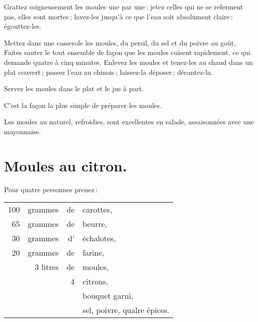 Grattez soigneusement les moules une par une ; jetez celles qui ne se referment
pas, elles sont mortes ; lavez-les jusqu'à ce que l'eau soit absolument
claire ; égouttez-les.

Mettez dans une casserole les moules, du persil, du sel et du poivre au goût,
Faites sauter le tout ensemble de façon que les moules cuisent rapidement, ce
qui demande quatre à cinq minutes. Enlevez les moules et tenez-les au chaud
dans un plat couvert ; passez l'eau au chinois ; laissez-la déposer ;
décantez-la.

Servez les moules dans le plat et le jus à part.

C'est la façon la plus simple de préparer les moules.

\sk

Les moules au naturel, refroidies, sont excellentes en salade, assaisonnées
avec une mayonnaise.

\section*{\centering Moules au citron.}

Pour quatre personnes prenez :

\medskip

\footnotesize
\begin{longtable}{rrrp{16em}}
    100 & grammes & de & carottes,                                                                        \\
     65 & grammes & de & beurre,                                                                          \\
     30 & grammes & d’ & échalotes,                                                                       \\
     20 & grammes & de & farine,                                                                          \\
        & 3 litres& de & moules,                                                                          \\
        &         &  4 & citrons,                                                                         \\
        &         &    & bouquet garni,                                                                   \\
        &         &    & sel, poivre, qualre épices.                                                      \\
\end{longtable}
\normalsize

